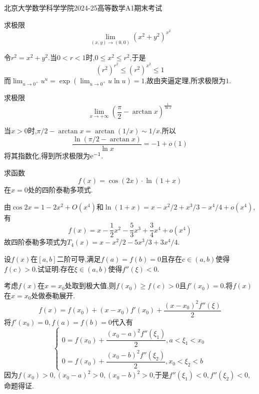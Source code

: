 \documentclass{ctexart}
\begin{document}
\pagestyle{empty}
\begin{center}\Large
北京大学数学科学学院2024-25高等数学A1期末考试
\end{center}
\begin{problem}[1.(11\songti{分})]
求极限\[\lim_{(x,y)\to(0,0)}\left(x^2+y^2\right)^{x^2}\]
\end{problem}
\begin{solution}
令$r^2=x^2+y^2$.当$0<r<1$时,$0\leqslant x^2\leqslant r^2$,于是
\[(r^2)^{r^2}\leqslant(r^2)^{x^2}\leqslant1\]
而$\lim_{u\to0^+}u^u=\exp(\lim_{u\to0^+}u\ln u)=1$,故由夹逼定理,所求极限为$1$.
\end{solution}
\begin{problem}[2.(11\songti{分})]
求极限\[\lim_{x\to+\infty}\left(\dfrac{\pi}{2}-\arctan x\right)^{\frac{1}{\ln x}}\]
\end{problem}
\begin{solution}
当$x>0$时,$\pi/2-\arctan x=\arctan(1/x)\sim1/x$.所以
\[\dfrac{\ln(\pi/2-\arctan x)}{\ln x}=-1+o(1)\]
将其指数化,得到所求极限为$\mathrm{e}^{-1}$.
\end{solution}
\begin{problem}[3.(11\songti{分})]
求函数\[f(x)=\cos(2x)\cdot\ln(1+x)\]在$x=0$处的四阶泰勒多项式.
\end{problem}
\begin{solution}
由$\cos2x=1-2x^2+O(x^4)$和$\ln(1+x)=x-x^2/2+x^3/3-x^4/4+o(x^4)$,有
\[f(x)=x-\dfrac12x^2-\dfrac53x^3+\dfrac34x^4+o(x^4)\]
故四阶泰勒多项式为$T_4(x)=x-x^2/2-5x^3/3+3x^4/4$.
\end{solution}
\begin{problem}[4.(12\songti{分})]
设$f(x)$在$[a,b]$二阶可导,满足$f(a)=f(b)=0$且存在$c\in(a,b)$使得$f(c)>0$.试证明:存在$\xi\in(a,b)$使得$f''(\xi)<0$.
\end{problem}
\begin{solution}
考虑$f(x)$在$x=x_0$处取到极大值,则$f(x_0)\geqslant f(c)>0$且$f'(x_0)=0$.将$f(x)$在$x=x_0$处做泰勒展开.
    \[f(x)=f(x_0)+(x-x_0)f'(x_0)+\dfrac{(x-x_0)^2f''(\xi)}{2}\]
    将$f'(x_0)=0,f(a)=f(b)=0$代入有
    \[\left\{\begin{array}{l}
        0=f(x_0)+\dfrac{(x_0-a)^2f''(\xi_1)}{2},a<\xi_1<x_0 \\
        0=f(x_0)+\dfrac{(x_0-b)^2f''(\xi_2)}{2},x_0<\xi_2<b
    \end{array}\right.\]
    因为$f(x_0)>0,(x_0-a)^2>0,(x_0-b)^2>0$,于是$f''(\xi_1)<0,f''(\xi_2)<0$,命题得证.
\end{solution}
\end{document}
